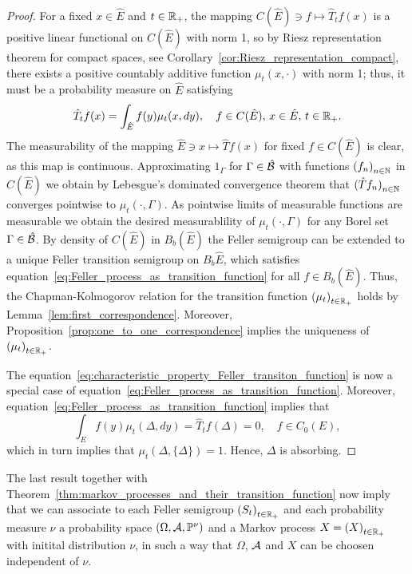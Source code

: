 \documentclass[../Master.tex]{subfiles}
\begin{document}
\begin{proof}
  For a fixed \(x \in \hat{E}\) and \(t \in \mathbb{R}_+\), the mapping \(C(\hat{E}) \ni f \mapsto \hat{T}_t f(x)\) is a positive linear functional on \(C(\hat{E})\) with norm 1, so by Riesz representation theorem for compact spaces, see Corollary~\ref{cor:Riesz_representation_compact}, there exists a positive countably additive function \(\mu_t(x, \cdot)\) with norm 1; thus, it must be a probability measure on \(\hat{E}\) satisfying
  \begin{equation}\label{eq:Feller_process_as_transition_function}
    \hat{T}_t f(x) = \int_{\hat{E}} f(y) \mu_t (x, dy), \quad f \in C(\hat{E}), \, x \in \hat{E}, \, t \in \mathbb{R}_+.
  \end{equation}
  The measurability of the mapping \(\hat{E} \ni x \mapsto \hat{T}f(x)\) for fixed \(f \in C(\hat{E})\) is clear, as this map is continuous. Approximating \(1_\Gamma{}\) for \(\Gamma \in \hat{\cal{B}}\) with functions \({(f_n)}_{n \in \mathbb{N}}\) in \(C(\hat{E})\) we obtain by Lebesgue's dominated convergence theorem that \({(\hat{T}f_n)}_{n \in \mathbb{N}}\) converges pointwise to \(\mu_t(\cdot, \Gamma)\). As pointwise limits of measurable functions are measurable we obtain the desired measurablility of \(\mu_t(\cdot, \Gamma)\) for any Borel set \(\Gamma \in \hat{\cal{B}}\). By density of \(C(\hat{E})\) in \(B_b(\hat{E})\) the Feller semigroup can be extended to a unique Feller transition semigroup on \(B_b{\hat{E}}\), which satisfies equation~\eqref{eq:Feller_process_as_transition_function} for all \(f \in B_b(\hat{E})\). Thus, the Chapman-Kolmogorov relation for the transition function \({(\mu_t)}_{t \in \mathbb{R}_+}\) holds by Lemma~\ref{lem:first_correspondence}. Moreover, Proposition~\ref{prop:one_to_one_correspondence} implies the uniqueness of \({(\mu_t)}_{t \in \mathbb{R}_+}\).

  The equation~\eqref{eq:characteristic_property_Feller_transiton_function} is now a special case of equation~\eqref{eq:Feller_process_as_transition_function}. Moreover, equation~\eqref{eq:Feller_process_as_transition_function} implies that
  \begin{equation*}
    \int_E f(y) \mu_t(\Delta, dy) = \hat{T}_t f(\Delta) = 0, \quad f \in C_0(E),
  \end{equation*}
  which in turn implies that \(\mu_t(\Delta, \{\Delta{}\}) = 1\). Hence, \(\Delta{}\) is absorbing.
\end{proof}

The last result together with Theorem~\ref{thm:markov_processes_and_their_transition_function} now imply that we can associate to each Feller semigroup \({(S_t)}_{t \in \mathbb{R}_+}\) and each probability measure \(\nu{}\) a probability space \((\Omega, \mathcal{A}, \mathbb{P}^\nu)\) and a Markov process \(X = {(X)}_{t \in \mathbb{R}_+}\) with initital distribution \(\nu{}\), in such a way that \(\Omega{}\), \(\mathcal{A}\) and \(X\) can be choosen independent of \(\nu{}\).
\end{document}
